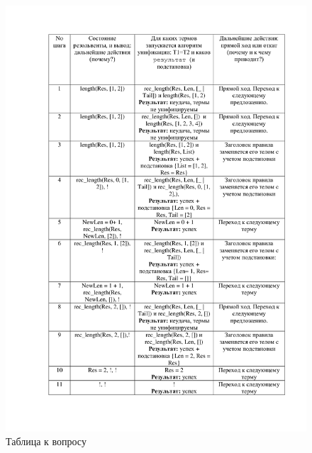 \documentclass[12pt]{report}
\begin{document}
\begin{figure}[H]
	\centering
	\includegraphics[scale=0.25]{lab_07_01.jpg}
	\caption{Таблица к вопросу}
	\label{d:matr_rec}
\end{figure}
\end{document}
